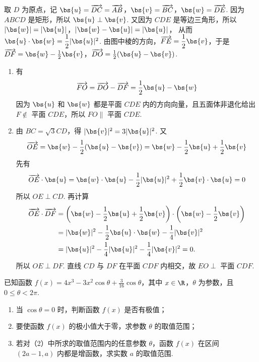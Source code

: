 \begin{solution}
取 \(D\) 为原点，记
\(\bs{u}=\overrightarrow{DC}=\overrightarrow{AB}\)，\(\bs{v}=\overrightarrow{BC}\)，\(\bs{w}=\overrightarrow{DE}\).
因为 \(ABCD\) 是矩形，所以 \(\bs{u}\perp\bs{v}\). 又因为 \(CDE\) 是等边三角形，所以
\(|\bs{w}|=|\bs{u}|\)，\(|\bs{w}-\bs{u}|=|\bs{u}|\)，
从而 \(\bs{u}\cdot\bs{w}=\dfrac12|\bs{u}|^{2}\). 由图中棱的方向，\(\overrightarrow{FE}=\dfrac12\bs{v}\)，于是
\(\overrightarrow{DF}=\bs{w}-\frac12\bs{v}\)，\(\overrightarrow{DO}=\frac12(\bs{u}-\bs{v})\).
\begin{enumerate}
\item 有
\[
\overrightarrow{FO}=\overrightarrow{DO}-\overrightarrow{DF}=\frac12\bs{u}-\bs{w}
\]
因为 \(\bs{u}\) 和 \(\bs{w}\) 都是平面 \(CDE\) 内的方向向量，且五面体非退化给出 \(F\notin\) 平面 \(CDE\)，所以 \(FO\parallel\) 平面 \(CDE\).
\item 由 \(BC=\sqrt3CD\)，得 \(|\bs{v}|^{2}=3|\bs{u}|^{2}\). 又
\[
\overrightarrow{OE}=\bs{w}-\frac12(\bs{u}-\bs{v})=\bs{w}-\frac12\bs{u}+\frac12\bs{v}
\]
先有
\[
\overrightarrow{OE}\cdot\bs{u}=\bs{w}\cdot\bs{u}-\frac12|\bs{u}|^{2}+\frac12\bs{v}\cdot\bs{u}=0
\]
所以 \(OE\perp CD\). 再计算
\[
\begin{aligned}
\overrightarrow{OE}\cdot\overrightarrow{DF}
&=\left(\bs{w}-\frac12\bs{u}+\frac12\bs{v}\right)\cdot\left(\bs{w}-\frac12\bs{v}\right)\\
&=|\bs{w}|^{2}-\frac12\bs{u}\cdot\bs{w}-\frac14|\bs{v}|^{2}\\
&=|\bs{u}|^{2}-\frac14|\bs{u}|^{2}-\frac14|\bs{v}|^{2}=0.
\end{aligned}
\]
所以 \(OE\perp DF\). 直线 \(CD\) 与 \(DF\) 在平面 \(CDF\) 内相交，故 \(EO\perp\) 平面 \(CDF\).
\end{enumerate}
\end{solution}

\begin{problem}
已知函数 \(f(x)=4x^{3}-3x^{2}\cos\theta+\frac{3}{16}\cos\theta\)，其中 \(x\in\R\)，\(\theta\) 为参数，且 \(0\leqslant\theta<2\pi\).

\begin{enumerate}
\item 当 \(\cos\theta=0\) 时，判断函数 \(f(x)\) 是否有极值；
\item 要使函数 \(f(x)\) 的极小值大于零，求参数 \(\theta\) 的取值范围；
\item 若对（2）中所求的取值范围内的任意参数 \(\theta\)，函数 \(f(x)\) 在区间 \((2a-1,a)\) 内都是增函数，求实数 \(a\) 的取值范围.
\end{enumerate}
\end{problem}

